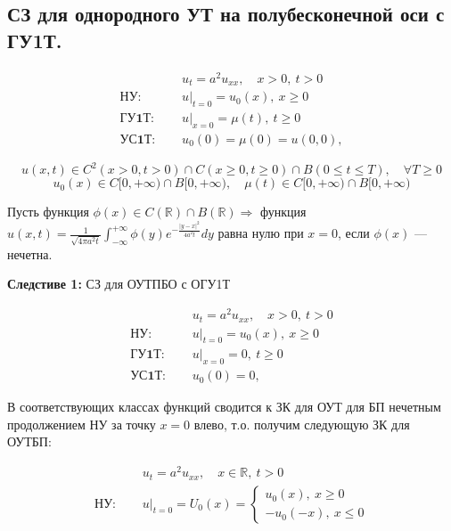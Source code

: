 \subsection{СЗ для однородного УТ на полубесконечной оси с ГУ1Т.}

\begin{align*}
	& u_{t} = a^2 u_{xx}, \quad x > 0,\ t > 0 \tag{1.0}    \\
	\textbf{НУ: } \quad    & u|_{t=0}=u_0(x),\ x \ge 0 \tag{2} \\
	\textbf{ГУ1Т: } \quad & u|_{x=0} = \mu(t),\ t \ge 0 \tag{3.1}                      \\
	\textbf{УС1Т: } \quad    & u_0(0)=\mu(0)=u(0, 0), \tag{4.1}
\end{align*}

\[
	u(x, t) \in C^2(x > 0, t > 0) \cap C(x \ge 0, t \ge 0) \cap B(0 \le t \le T),\quad \forall T \ge 0
\]
\[
	u_0(x) \in C[0, +\infty) \cap B[0, +\infty),\quad
	\mu(t) \in C[0, +\infty) \cap B[0, +\infty)
\]

\begin{lemma}
	Пусть функция $\phi(x) \in C(\mathbb{R}) \cap B(\mathbb{R}) \Rightarrow$ функция $u(x, t) = \frac{1}{\sqrt{4\pi a^2 t}}\int_{-\infty}^{+\infty} \phi(y) e^{-\frac{|y-x|^2}{4a^2 t}} dy$ равна нулю при $x=0$, если $\phi(x)$ --- нечетна.
\end{lemma}

\textbf{Следстиве 1:} СЗ для ОУТПБО с ОГУ1Т

\begin{align*}
	& u_{t} = a^2 u_{xx}, \quad x > 0,\ t > 0 \tag{1.0}    \\
	\textbf{НУ: } \quad    & u|_{t=0}=u_0(x),\ x \ge 0 \tag{2} \\
	\textbf{ГУ1Т: } \quad & u|_{x=0} = 0,\ t \ge 0 \tag{3.1.0}                      \\
	\textbf{УС1Т: } \quad    & u_0(0)=0, \tag{4.1.0}
\end{align*}

В соответствующих классах функций сводится к ЗК для ОУТ для БП нечетным продолжением НУ за точку $x=0$ влево, т.о. получим следующую ЗК для ОУТБП:

\begin{align*}
	& u_{t} = a^2 u_{xx}, \quad x \in \mathbb{R},\ t > 0 \tag{1.0}    \\
	\textbf{НУ: } \quad    & u|_{t=0}=U_0(x)=
	\begin{cases}
		u_0(x),\ x \ge 0\\
		-u_0(-x),\ x \le 0
	\end{cases} \tag{2.НУ}
\end{align*}

